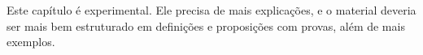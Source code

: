 \documentclass[../../../include/open-logic-chapter]{subfiles}
\begin{document}

\begin{editorial}
  Este capítulo é experimental. Ele precisa de mais explicações, e o
  material deveria ser mais bem estruturado em definições e proposições com
  provas, além de mais exemplos.
\end{editorial}


\OLEndChapterHook
\end{document}
